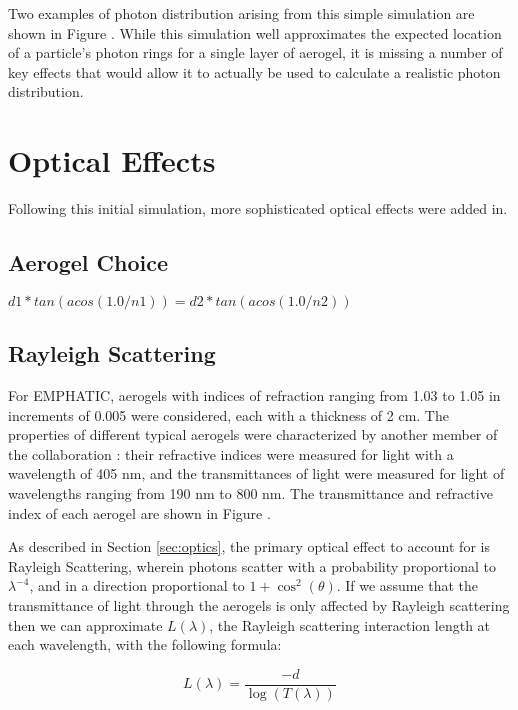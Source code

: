 Two examples of photon distribution arising from this simple simulation are shown in Figure .
While this simulation well approximates the expected location of a particle's photon rings for a single layer of aerogel, it is missing a number of key effects that would allow it to actually be used to calculate a realistic photon distribution.

\section{Optical Effects}
Following this initial simulation, more sophisticated optical effects were added in. 

\subsection{Aerogel Choice}


$d1*tan(acos(1.0/n1)) = d2*tan(acos(1.0/n2)) $

\subsection{Rayleigh Scattering}

For EMPHATIC, aerogels with indices of refraction ranging from 1.03 to 1.05 in increments of 0.005 were considered, each with a thickness of 2 cm.
The properties of different typical aerogels were characterized by another member of the collaboration : their refractive indices were measured for light with a wavelength of 405 nm, and the transmittances of light were measured for light of wavelengths ranging from 190 nm to 800 nm.
The transmittance and refractive index of each aerogel are shown in Figure .

As described in Section \ref{sec:optics}, the primary optical effect to account for is Rayleigh Scattering, wherein photons scatter with a probability proportional to $\lambda^{-4}$, and in a direction proportional to $1 + \cos^2(\theta)$.
If we assume that the transmittance of light through the aerogels is only affected by Rayleigh scattering then we can approximate $L(\lambda)$, the Rayleigh scattering interaction length at each wavelength, with the following formula:

\begin{equation}
L(\lambda) = \frac{-d}{\log(T(\lambda))}
    \label{eq:scatLength}
\end{equation}

